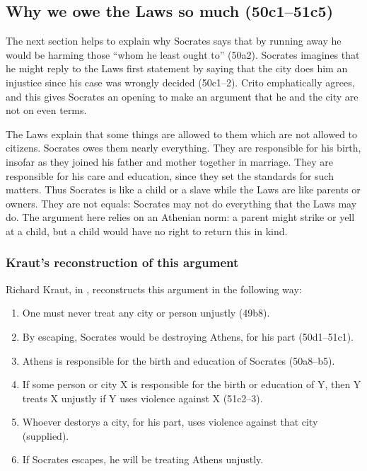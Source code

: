 \documentclass[12pt,letterpaper]{article}
\begin{document}
\subsection*{Why we owe the Laws so much (50c1--51c5)}

The next section helps to explain why Socrates says that by running away he would be harming those ``whom he least ought to'' (50a2).
Socrates imagines that he might reply to the Laws first statement by saying that the city does him an injustice since his case was wrongly decided (50c1--2).
Crito emphatically agrees, and this gives Socrates an opening to make an argument that he and the city are not on even terms.

The Laws explain that some things are allowed to them which are not allowed
to citizens.
Socrates owes them nearly everything.
They are responsible for his birth, insofar as they joined his father and mother together in marriage.
They are responsible for his care and education, since they set the standards for such matters.
Thus Socrates is like a child or a slave while the Laws are like parents or owners.
They are not equals: Socrates may not do everything that the Laws may do.
The argument here relies on an Athenian norm: a parent might strike or yell at a child, but a child would have no right to return this in kind.

\subsubsection*{Kraut's reconstruction of this argument}

Richard Kraut, in \cite{kraut-socrates-state-1984}, reconstructs this argument in the following way:

\begin{enumerate}

    \item One must never treat any city or person unjustly (49b8).

    \item By escaping, Socrates would be destroying Athens, for his part (50d1--51c1).

    \item Athens is responsible for the birth and education of Socrates (50a8--b5).

    \item If some person or city X is responsible for the birth or education of Y, then Y treats X unjustly if Y uses violence against X (51c2--3).

    \item Whoever destorys a city, for his part, uses violence against that city (supplied).

    \item If Socrates escapes, he will be treating Athens unjustly.

\end{enumerate}
\end{document}
